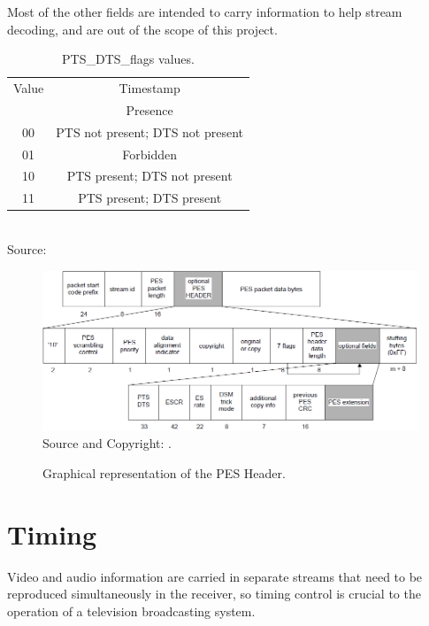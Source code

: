 \documentclass[
	12pt,				%
	openright,			%
	twoside,			%
	a4paper,			%
	brazil,
	french,				%
	english
	]{abntex2}
\begin{document}
Most of the other fields are intended to carry information to help stream decoding, and are out of the scope of this project.

\begin{table}[!hb]
\caption{PTS\_DTS\_flags values.}
\begin{center}
\begin{tabular}{|c|c|}
\hline
Value & Timestamp \\
& Presence \\
\hline
00 & PTS not present; DTS not present\\
\hline
01 & Forbidden\\
\hline
10 & PTS present; DTS not present\\
\hline
11 & PTS present; DTS present\\
\hline
\end{tabular}
\label{tab_PTS_DTS_flags}
\\Source: 
\end{center}
\end{table}

\begin{figure}
\centering
\caption{Graphical representation of the PES Header.}
\includegraphics[width=1\linewidth]{figuras/PES_iso13818.png}
\\Source and Copyright: .
\label{fig:PES_iso13818}
\end{figure}

\section{Timing}
\label{Timing}

Video and audio information are carried in separate streams that need to be reproduced simultaneously in the receiver, so timing control is crucial to the operation of a television broadcasting system. 

\end{document}
